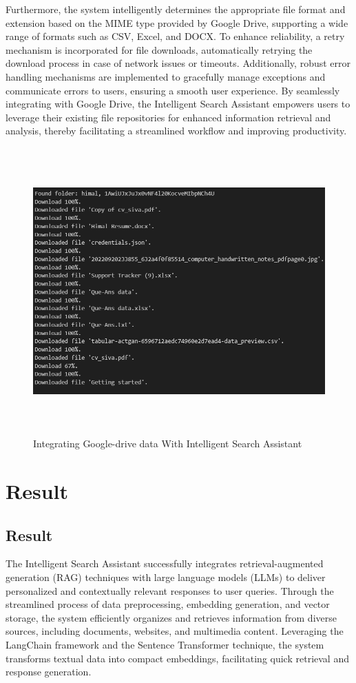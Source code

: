 \documentclass[12pt,a4paper,oneside]{report}
\begin{document}
Furthermore, the system intelligently determines the appropriate file format and extension based on the MIME type provided by Google Drive, supporting a wide range of formats such as CSV, Excel, and DOCX. To enhance reliability, a retry mechanism is incorporated for file downloads, automatically retrying the download process in case of network issues or timeouts. Additionally, robust error handling mechanisms are implemented to gracefully manage exceptions and communicate errors to users, ensuring a smooth user experience. By seamlessly integrating with Google Drive, the Intelligent Search Assistant empowers users to leverage their existing file repositories for enhanced information retrieval and analysis, thereby facilitating a streamlined workflow and improving productivity.
\hspace{10pt}

\begin{figure}[ht]
    \centering
    \includegraphics[width=145mm , height = 110mm]{images/google-drive.png}
    \caption{Integrating Google-drive data With Intelligent Search Assistant}
    \label{fig:figure2_2}
\end{figure}

\newpage
\chapter{Result}
\section{Result}
\par The Intelligent Search Assistant successfully integrates retrieval-augmented generation (RAG) techniques with large language models (LLMs) to deliver personalized and contextually relevant responses to user queries. Through the streamlined process of data preprocessing, embedding generation, and vector storage, the system efficiently organizes and retrieves information from diverse sources, including documents, websites, and multimedia content. Leveraging the LangChain framework and the Sentence Transformer technique, the system transforms textual data into compact embeddings, facilitating quick retrieval and response generation.
\end{document}
